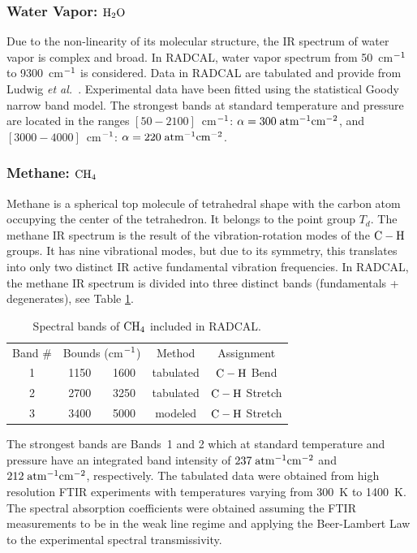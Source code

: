 \subsubsection{Water Vapor: $\rm H_2O$}

Due to the non-linearity of its molecular structure, the IR spectrum of water vapor is complex and broad. In RADCAL, water vapor spectrum from 50~cm$\rm ^{-1}$ to 9300~cm$\rm ^{-1}$ is considered. Data in RADCAL are tabulated and provide from Ludwig \textit{et al.}~\cite{Ludwig:NASA}. Experimental data have been fitted using the statistical Goody narrow band model. The strongest bands at standard temperature and pressure are located in the ranges $\left[50-2100\right]$~cm$\rm ^{-1}$: $\alpha = 300\;\rm {atm^{-1}cm^{-2}}$, and $\left[3000-4000\right]$~cm$\rm ^{-1}$: $\alpha = 220\;\rm {atm^{-1}cm^{-2}}$.

\subsubsection{Methane: $\rm CH_4$}

Methane is a spherical top molecule of tetrahedral shape with the carbon atom occupying the center of the tetrahedron. It belongs to the point group $T_d$. The methane IR spectrum is the result of the vibration-rotation modes of the $\rm C-H$ groups. It has nine vibrational modes, but due to its symmetry, this translates into only two distinct IR active fundamental vibration frequencies. In RADCAL, the methane IR spectrum is divided into three distinct bands (fundamentals + degenerates), see Table \ref{Table::CH4}.
\begin{table}[ht]
      \centering
      \caption{Spectral bands of $\rm CH_4$ included in RADCAL.}
      \vspace{0.1in}
      \label{Table::CH4}
    \begin{tabular}{|c|c|c|c|c|}
    \hline
    Band \# & \multicolumn{2}{|l|}{Bounds (cm$\rm ^{-1}$) } & Method & Assignment \\
    \cline{1-5}
    1 & 1150 & 1600 & tabulated &  $\rm C-H$ Bend\\
    2 & 2700 & 3250 & tabulated &  $\rm C-H$ Stretch\\
    3 & 3400 & 5000 & modeled   &  $\rm C-H$ Stretch \\
    \hline
   \end{tabular}
\end{table}
The strongest bands are Bands~1 and 2 which at standard temperature and pressure have an integrated band intensity of $237\;\rm {atm^{-1}cm^{-2}}$ and $212\;\rm {atm^{-1}cm^{-2}}$, respectively. The tabulated data were obtained from high resolution FTIR experiments with temperatures varying from 300~K to 1400~K. The spectral absorption coefficients were obtained assuming the FTIR measurements to be in the weak line regime and applying the Beer-Lambert Law to the experimental spectral transmissivity.

